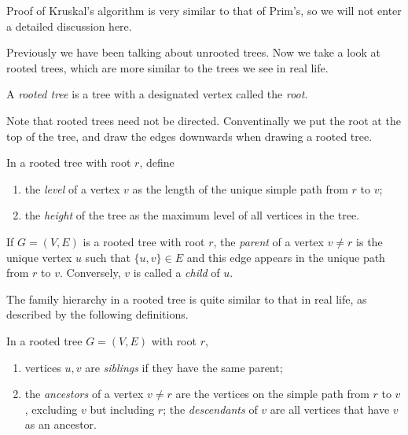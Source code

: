 Proof of Kruskal's algorithm is very similar to that of Prim's, so we will not enter a detailed discussion here.

Previously we have been talking about unrooted trees. Now we take a look at rooted trees, which are more similar to the trees we see in real life.

\begin{definition}
    A \emph{rooted tree} is a tree with a designated vertex called the \emph{root}.
\end{definition}

Note that rooted trees need not be directed. Conventinally we put the root at the top of the tree, and draw the edges downwards when drawing a rooted tree. 

\begin{definition}
    In a rooted tree with root $r$, define 
    \begin{enumerate}[itemindent=0ex, itemsep=0pt, label=\upshape{(\alph*)}]
        \item the \emph{level} of a vertex $v$ as the length of the unique simple path from $r$ to $v$;
        \item the \emph{height} of the tree as the maximum level of all vertices in the tree.
    \end{enumerate}
\end{definition}

\begin{definition}
    If $G=(V,E)$ is a rooted tree with root $r$, the \emph{parent} of a vertex $v\neq r$ is the unique vertex $u$ such that $\{u,v\}\in E$ and this edge appears in the unique path from $r$ to $v$. Conversely, $v$ is called a \emph{child} of $u$. 
\end{definition}

The family hierarchy in a rooted tree is quite similar to that in real life, as described by the following definitions.

\begin{definition}
    In a rooted tree $G=(V,E)$ with root $r$, 
    \begin{enumerate}[itemindent=0ex, itemsep=0pt, label=\upshape{(\alph*)}]
        \item vertices $u,v$ are \emph{siblings} if they have the same parent;
        \item the \emph{ancestors} of a vertex $v\neq r$ are the vertices on the simple path from $r$ to $v$, excluding $v$ but including $r$; the \emph{descendants} of $v$ are all vertices that have $v$ as an ancestor.
    \end{enumerate}
\end{definition}

